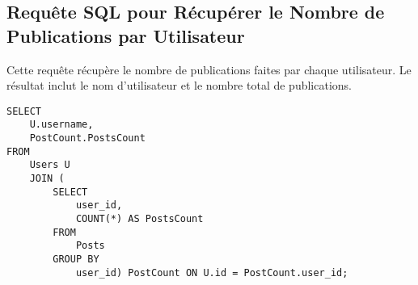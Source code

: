 \subsection{Requête SQL pour Récupérer le Nombre de Publications par Utilisateur}

Cette requête récupère le nombre de publications faites par chaque utilisateur. Le résultat inclut le nom d'utilisateur et le nombre total de publications.

\begin{lstlisting}
SELECT
    U.username,
    PostCount.PostsCount
FROM
    Users U
    JOIN (
        SELECT
            user_id,
            COUNT(*) AS PostsCount
        FROM
            Posts
        GROUP BY
            user_id) PostCount ON U.id = PostCount.user_id;
\end{lstlisting}